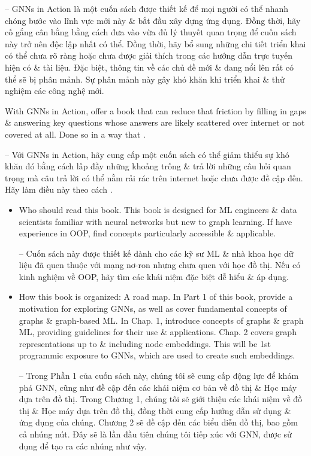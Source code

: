\documentclass{article}
\begin{document}
\begin{itemize}
    -- GNNs in Action là một cuốn sách được thiết kế để mọi người có thể nhanh chóng bước vào lĩnh vực mới này \& bắt đầu xây dựng ứng dụng. Đồng thời, hãy cố gắng cân bằng bằng cách đưa vào vừa đủ lý thuyết quan trọng để cuốn sách này trở nên độc lập nhất có thể. Đồng thời, hãy bổ sung những chi tiết triển khai có thể chưa rõ ràng hoặc chưa được giải thích trong các hướng dẫn trực tuyến hiện có \& tài liệu. Đặc biệt, thông tin về các chủ đề mới \& đang nổi lên rất có thể sẽ bị phân mảnh. Sự phân mảnh này gây khó khăn khi triển khai \& thử nghiệm các công nghệ mới.

    With GNNs in Action, offer a book that can reduce that friction by filling in gaps \& answering key questions whose answers are likely scattered over internet or not covered at all. Done so in a way that .

    -- Với GNNs in Action, hãy cung cấp một cuốn sách có thể giảm thiểu sự khó khăn đó bằng cách lấp đầy những khoảng trống \& trả lời những câu hỏi quan trọng mà câu trả lời có thể nằm rải rác trên internet hoặc chưa được đề cập đến. Hãy làm điều này theo cách .
    \begin{itemize}
        \item {\sf Who should read this book.} This book is designed for ML engineers \& data scientists familiar with neural networks but new to graph learning. If have experience in OOP, find concepts particularly accessible \& applicable.

        -- Cuốn sách này được thiết kế dành cho các kỹ sư ML \& nhà khoa học dữ liệu đã quen thuộc với mạng nơ-ron nhưng chưa quen với học đồ thị. Nếu có kinh nghiệm về OOP, hãy tìm các khái niệm đặc biệt dễ hiểu \& áp dụng.
        \item {\sf How this book is organized: A road map.} In Part 1 of this book, provide a motivation for exploring GNNs, as well as cover fundamental concepts of graphs \& graph-based ML. In Chap. 1, introduce concepts of graphs \& graph ML, providing guidelines for their use \& applications. Chap. 2 covers graph representations up to \& including node embeddings. This will be 1st programmic exposure to GNNs, which are used to create such embeddings.

        -- Trong Phần 1 của cuốn sách này, chúng tôi sẽ cung cấp động lực để khám phá GNN, cũng như đề cập đến các khái niệm cơ bản về đồ thị \& Học máy dựa trên đồ thị. Trong Chương 1, chúng tôi sẽ giới thiệu các khái niệm về đồ thị \& Học máy dựa trên đồ thị, đồng thời cung cấp hướng dẫn sử dụng \& ứng dụng của chúng. Chương 2 sẽ đề cập đến các biểu diễn đồ thị, bao gồm cả nhúng nút. Đây sẽ là lần đầu tiên chúng tôi tiếp xúc với GNN, được sử dụng để tạo ra các nhúng như vậy.


\end{itemize}
\end{itemize}
\end{document}
